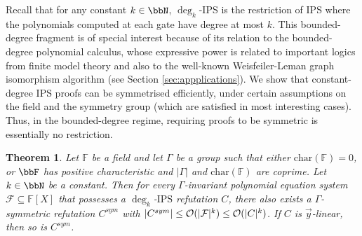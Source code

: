 \documentclass[10pt,a4paper]{article}
\newtheorem{theorem}{Theorem}
\newcommand{\IPS}{\mathrm{IPS}}
\newcommand{\Oo}{{\cal O}}
\newcommand{\Field}{\ensuremath{\mathbb{F}}}
\newcommand{\Circ}{C} %
\newcommand{\F}{\ensuremath{\mathcal{F}}}
\begin{document}
Recall that for any constant $k \in \bbN$, $\deg_k$-IPS is the restriction of IPS where the polynomials computed at each gate have degree at most $k$. This bounded-degree fragment is of special interest because of its relation to the bounded-degree polynomial calculus, whose expressive power is related to important logics from finite model theory and also to the well-known Weisfeiler-Leman graph isomorphism algorithm (see Section \ref{sec:appplications}).
We show that constant-degree IPS proofs can be symmetrised efficiently, under certain assumptions on the field and the symmetry group (which are satisfied in most interesting cases). Thus, in the bounded-degree regime, requiring proofs to be symmetric is essentially no restriction.

\begin{theorem}
	\label{thm:deg_IPS=deg_sym_IPS}
	Let $\Field$ be a field and let $\Gamma$ be a group
	such that either $\mathrm{char}(\Field) = 0$, or $\bbF$ has positive characteristic and $|\Gamma|$ and $\mathrm{char}(\Field)$ are coprime. Let $k \in \bbN$ be a constant. 
	Then for every $\Gamma$-invariant polynomial equation system $\F \subseteq \Field[X]$ that possesses a $\deg_k$-$\IPS$ refutation $\Circ$, there also exists a \emph{$\Gamma$-symmetric} refutation $\Circ^{sym}$ with $|\Circ^{sym}| \leq \Oo(|\F|^{k}) \leq \Oo(|\Circ|^{k})$.
	If $\Circ$ is $\vec{y}$-linear, then so is $\Circ^{sym}$.
\end{theorem}
\end{document}
